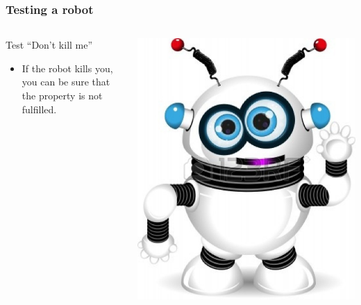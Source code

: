 \documentclass{beamer}
\begin{document}
\begin{frame}
\frametitle{Testing a robot}

    \begin{columns}[c] %
    \begin{block}{Test \color{red}``Don't kill me''}
    \begin{itemize}
      \item If the robot kills you, you can be sure that the property is not fulfilled.
    \end{itemize}
    \end{block}
    \includegraphics[width=\textwidth]{../img/robot}
    \end{columns}
\end{frame}
\end{document}
